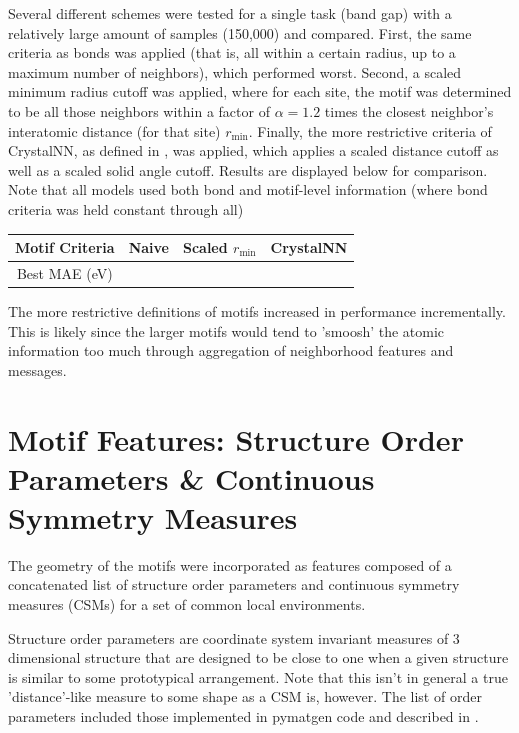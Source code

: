 \documentclass[10pt,a4paper]{article}
\begin{document}
Several different schemes were tested for a single task (band gap) with a relatively large amount of samples (150,000) and compared. First, the same criteria as bonds was applied (that is, all within a certain radius, up to a maximum number of neighbors), which performed worst. Second, a scaled minimum radius cutoff was applied, where for each site, the motif was determined to be all those neighbors within a factor of $\alpha=1.2$ times the closest neighbor's interatomic distance (for that site) $r_{\text{min}}$. Finally, the more restrictive criteria of CrystalNN, as defined in \cite{crystalnn}, was applied, which applies a scaled distance cutoff as well as a scaled solid angle cutoff. Results are displayed below for comparison. Note that all models used both bond and motif-level information (where bond criteria was held constant through all)

\begin{center}

\begin{tabular}{c|ccc}

Motif Criteria & Naive & Scaled $r_{\text{min}}$& CrystalNN \\
\hline
Best MAE (eV)  \\
\end{tabular}
\end{center}
The more restrictive definitions of motifs increased in performance incrementally. This is likely since the larger motifs would tend to 'smoosh' the atomic information too much through aggregation of neighborhood features and messages.

\section{Motif Features: Structure Order Parameters \& Continuous Symmetry Measures}
The geometry of the motifs were incorporated as features composed of a concatenated list of structure order parameters and continuous symmetry measures (CSMs) for a set of common local environments. 

Structure order parameters are coordinate system invariant measures of 3 dimensional structure that are designed to be close to one when a given structure is similar to some prototypical arrangement. Note that this isn't in general a true 'distance'-like measure to some shape as a CSM is, however. The list of order parameters included those implemented in pymatgen code \cite{lsop-pymatgen} and described in \cite{orderparam1, orderparam2}.
\end{document}
